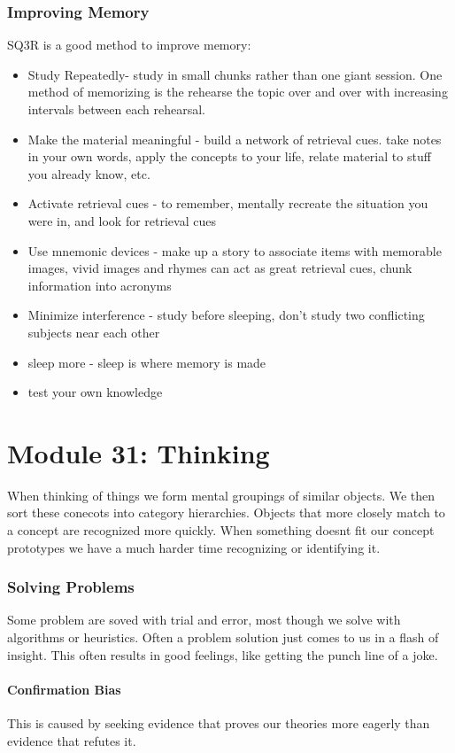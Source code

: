 \documentclass[12pt]{article}
\begin{document}
\section*{Improving Memory}
SQ3R is a good method to improve memory:
\begin{itemize}
\item Study Repeatedly- study in small chunks rather than one giant session. One method of memorizing is the rehearse the topic over and over with increasing intervals between each rehearsal. 
\item Make the material meaningful - build a network of retrieval cues. take notes in your own words, apply the concepts to your life, relate material to stuff you already know, etc.
\item Activate retrieval cues - to remember, mentally recreate the situation you were in, and look for retrieval cues
\item Use mnemonic devices - make up a story to associate items with memorable images, vivid images and rhymes can act as great retrieval cues, chunk information into acronyms
\item Minimize interference - study before sleeping, don’t study two conflicting subjects near each other
\item sleep more - sleep is where memory is made
\item test your own knowledge
\end{itemize}
\part*{Module 31: Thinking}
When thinking of things we form mental groupings of similar objects. We then sort these conecots into category hierarchies. Objects that more closely match to a concept are recognized more quickly. When something doesnt fit our concept prototypes we have a much harder time recognizing or identifying it.
\section*{Solving Problems}
Some problem are soved with trial and error, most though we solve with algorithms or heuristics.  Often a problem solution just comes to us in a flash of insight. This often results in good feelings, like getting the punch line of a joke.
\subsection*{Confirmation Bias} This is caused by seeking evidence that proves our theories more eagerly than evidence that refutes it. 
\end{document}
